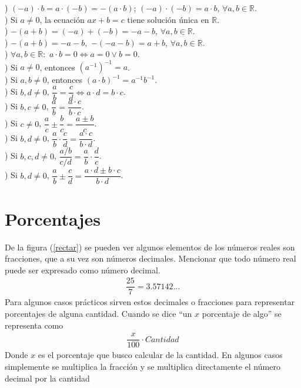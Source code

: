 ) $(-a)\cdot b=a\cdot(-b)=-(a\cdot b)$; \hspace{8px} $(-a)\cdot(-b)=a\cdot b$, $\forall a,b\in\mathbb{R}$. \\

) Si $a\neq 0$, la ecuación $ax+b=c$ tiene solución única en $\mathbb{R}$. \\

) $-(a+b)=(-a)+(-b)=-a-b$, $\forall a,b\in\mathbb{R}$. \\

) $-(a+b)=-a-b,$ $-(-a-b)=a+b$, $\forall a,b\in\mathbb{R}$. \\

) $\forall a,b\in\mathbb{R}:$ $a\cdot b=0\Leftrightarrow a=0\vee b=0$. \\

) Si $a\neq 0$, entonces $(a^{-1})^{-1}=a$. \\

) Si $a,b\neq 0$, entonces $(a\cdot b)^{-1}=a^{-1}b^{-1}$. \\

) Si $b,d\neq 0$, $\dfrac{a}{b}=\dfrac{c}{d}\Leftrightarrow a\cdot d =b\cdot c$. \\

) Si $b,c\neq 0$, $\dfrac{a}{b}=\dfrac{a\cdot c}{b\cdot c}$. \\

) Si $c\neq 0$, $\dfrac{a}{c}\pm\dfrac{b}{c}=\dfrac{a\pm b}{c}$. \\

) Si $b,d \neq 0$, $\dfrac{a}{b}\cdot\dfrac{c}{d}=\dfrac{a\cdot c}{b\cdot d}$. \\

) Si $b,c,d\neq 0$, $\dfrac{a/b}{c/d}=\dfrac{a}{b}\cdot\dfrac{d}{c}$. \\

) Si $b,d\neq 0$, $\dfrac{a}{b}\pm\dfrac{c}{d}=\dfrac{a\cdot d\pm b\cdot c}{b\cdot d}$. \\
\section{Porcentajes}
De la figura (\ref{rectar}) se  pueden ver algunos elementos de los números reales son fracciones, que a su vez son números decimales. Mencionar que todo número real puede ser expresado como número decimal.
\begin{eqnarray*}
\dfrac{25}{7}=3.57142...
\end{eqnarray*}
Para algunos casos prácticos sirven estos decimales o fracciones para representar porcentajes de  alguna cantidad. Cuando se dice ``un $x$ porcentaje de algo'' se representa como
\begin{eqnarray}
\dfrac{x}{100}\cdot Cantidad
\end{eqnarray} 
Donde $x$ es el porcentaje que busco calcular de la cantidad. En algunos casos simplemente se multiplica la fracción y se multiplica directamente el número decimal por la cantidad

